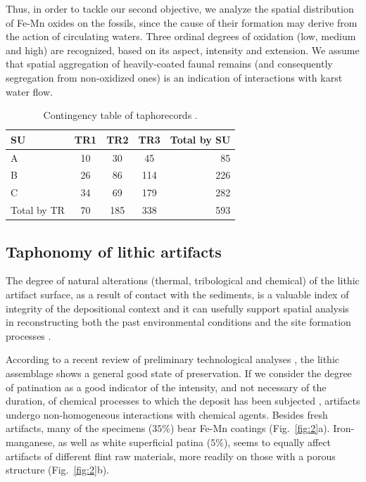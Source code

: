 \documentclass[5p,authoryear]{elsarticle} %
\begin{document}
Thus, in order to tackle our second objective, we analyze the spatial distribution of Fe-Mn oxides on the fossils, since the cause of their formation may derive from the action of circulating waters. Three ordinal degrees of oxidation (low, medium and high) are recognized, based on its aspect, intensity and extension. We assume that spatial aggregation of heavily-coated faunal remains (and consequently segregation from non-oxidized ones) is an indication of interactions with karst water flow.

\begin{table}
  \caption{Contingency table of taphorecords \citep[reproduced from][]{Bagnus2011}.}
  \label{tab:1}
  \vspace{0.1in}
  \centering
  \begin{tabular}{l c c c r}
    \hline
    SU & TR1 & TR2 & TR3 & Total by SU \\
    \hline
    A & 10 & 30 & 45 & 85 \\
    B & 26 & 86 & 114 & 226 \\
    C & 34 & 69 & 179 & 282 \\
    Total by TR & 70 & 185 & 338 & 593 \\
    \hline
  \end{tabular}
\end{table}
  
\subsection{Taphonomy of lithic artifacts}

The degree of natural alterations (thermal, tribological and chemical) of the lithic artifact surface, as a result of contact with the sediments, is a valuable index of integrity of the depositional context and it can usefully support spatial analysis in reconstructing both the past environmental conditions and the site formation processes \citep{Burroni2002}.

According to a recent review of preliminary technological analyses \citep{Arzarello2012,Arzarello2015}, the lithic assemblage shows a general good state of preservation. If we consider the degree of patination as a good indicator of the intensity, and not necessary of the duration, of chemical processes to which the deposit has been subjected \citep{Burroni2002}, artifacts undergo non-homogeneous interactions with chemical agents. Besides fresh artifacts, many of the specimens ($35\%$) bear Fe-Mn coatings (Fig.~\ref{fig:2}a). Iron-manganese, as well as white superficial patina ($5\%$), seems to equally affect artifacts of different flint raw materials, more readily on those with a porous structure (Fig.~\ref{fig:2}b).
\end{document}
